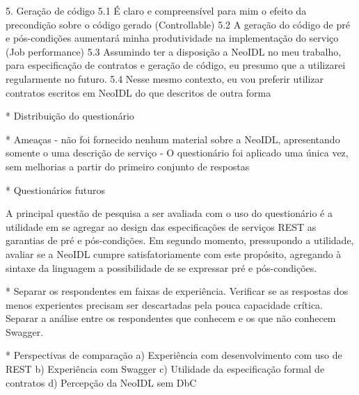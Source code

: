 5. Geração de código
5.1 É claro e compreensível para mim o efeito da precondição sobre o código
gerado  (Controllable)
5.2 A geração do código de pré e pós-condições aumentará minha produtividade na
implementação do serviço (Job performance)
5.3 Assumindo ter a disposição a NeoIDL no meu trabalho, para especificação de
contratos e geração de código, eu presumo que a utilizarei regularmente no futuro.
5.4 Nesse mesmo contexto, eu vou preferir utilizar contratos escritos em NeoIDL
do que descritos de outra forma



* Distribuição do questionário

% 

* Ameaças
- não foi fornecido nenhum material sobre a NeoIDL, apresentando somente o uma
descrição de serviço
- O questionário foi aplicado uma única vez, sem melhorias a partir do primeiro
conjunto de respostas




* Questionários futuros

A principal questão de pesquisa a ser avaliada com o uso do questionário é a utilidade em se agregar ao design das especificações de serviços REST as garantias de pré e
pós-condições. Em segundo momento, pressupondo a utilidade, avaliar se a NeoIDL
cumpre satisfatoriamente com este propósito, agregando à sintaxe da linguagem
a possibilidade de se expressar pré e pós-condições.

* Separar os respondentes em faixas de experiência. Verificar se as respostas
dos menos experientes precisam ser descartadas pela pouca capacidade crítica.
Separar a análise entre os respondentes que conhecem e os que não conhecem
Swagger.

* Perspectivas de comparação
a) Experiência com desenvolvimento com uso de REST
b) Experiência com Swagger
c) Utilidade da especificação formal de contratos
d) Percepção da NeoIDL sem DbC





